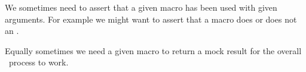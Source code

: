 %
%
%
\stopTestSuite


We sometimes need to assert that a given macro has been used with given 
arguments. For example we might want to assert that a macro does or does 
not  an \type{\errmessage}.

Equally sometimes we need a given 
macro to return a mock result for the overall \ConTeXt\ process to work. 

\startMkIVCode
\def\assertMockExpanded#1#2{%
  \directlua{%
    thirddata.contests.assertMockExpanded('#1', 1, '#2')
  }
}
\def\assertMockNeverExpanded#1#2{%
  \directlua{%
    thirddata.contests.assertMockNeverExpanded('#1', '#2')
  }
}
\def\assertMockExpandedNTimes#1#2#3{%
  \directlua{%
    thirddata.contests.assertMockExpanded('#1', #2, '#3')
  }
}
\stopMkIVCode

